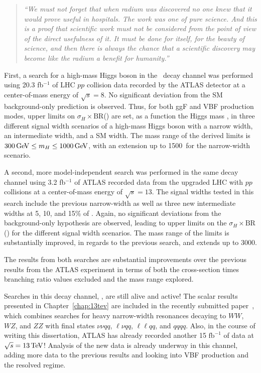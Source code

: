 \label{conc}
\begin{quote}
\raggedright{\emph{``We must not forget that when radium was discovered no one knew that it would prove useful in hospitals. The work was one of pure science. And this is a proof that scientific work must not be considered from the point of view of the direct usefulness of it. It must be done for itself, for the beauty of science, and then there is always the chance that a scientific discovery may become like the radium a benefit for humanity.''}} \\
\end{quote}
First, a search for a high-mass Higgs boson in the \hwwlnqq\ decay channel was performed using 20.3 fb$^{-1}$ of LHC $pp$ collision data recorded by the ATLAS detector at a center-of-mass energy of \ensuremath{\sqrt{s} = 8}\TeV. No significant deviation from the SM background-only prediction is observed. Thus, for both ggF and VBF production modes, upper limits on $\sigma_H \times \text{BR}$(\hww) are set, as a function the Higgs mass \mH, in three different signal width scenarios of a high-mass Higgs boson with a narrow width, an intermediate width, and a SM width. The mass range of the derived limits is $300\mathrm{\,Ge\kern -0.1em V} \leq m_{H} \leq 1000\mathrm{\,Ge\kern -0.1em V}$, with an extension up to 1500\GeV\ for the narrow-width scenario. 

A second, more model-independent search was performed in the same decay channel using 3.2 fb$^{-1}$ of ATLAS recorded data from the upgraded LHC with $pp$ collisions at a center-of-mass energy of \ensuremath{\sqrt{s} = 13}\TeV. The signal widths tested in this search include the previous narrow-width as well as three new intermediate widths at 5, 10, and 15\% of \mH. Again, no significant deviations from the background-only hypothesis are observed, leading to upper limits on the $\sigma_H \times \text{BR}$(\hww) for the different signal width scenarios. The mass range of the limits is substantially improved, in regards to the previous search, and extends up to 3000\GeV. 

The results from both searches are substantial improvements over the previous results from the ATLAS experiment in terms of both the cross-section times branching ratio values excluded and the mass range explored.

Searches in this decay channel, \wwlnqq, are still alive and active! The scalar results presented in Chapter~\ref{chap:13tev} are included in the recently submitted paper~\cite{13TeV_combo_paper}, which combines searches for heavy narrow-width resonances decaying to $WW$, $WZ$, and $ZZ$ with final states $\nu\nu qq$, $\ell\nu qq$, $\ell\ell qq$, and $qqqq$. Also, in the course of writing this dissertation, ATLAS has already recorded another 15$\text{ fb}^{-1}$ of data at $\sqrt{s} = 13\mathrm{\,Te\kern -0.1em V}$! Analysis of the new data is already underway in this channel, adding more data to the previous results and looking into VBF production and the resolved regime.